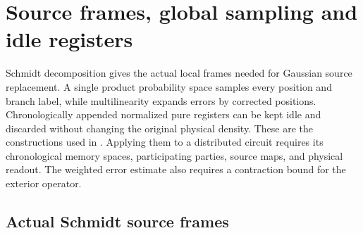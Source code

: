 
\section{Source frames, global sampling and idle registers}
\label{ch:source_constructions}

Schmidt decomposition gives the actual local frames needed for Gaussian
source replacement. A single product probability space samples every
position and branch label, while multilinearity expands errors by
corrected positions. Chronologically appended normalized pure registers
can be kept idle and discarded without changing the original physical
density. These are the constructions used in
\cite[Theorem~5.2]{OpenAI2026PolynomialPEPS}.
Applying them to a distributed circuit requires its chronological memory
spaces, participating parties, source maps, and physical readout.
The weighted error estimate also requires a contraction bound for the
exterior operator.

\subsection{Actual Schmidt source frames}

